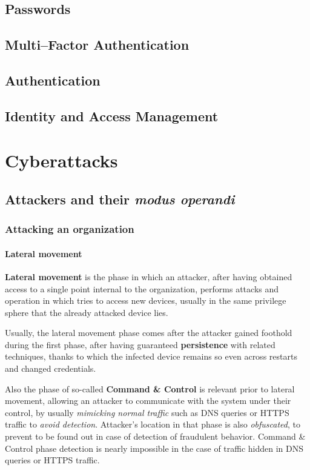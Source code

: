 \documentclass[10pt]{extbook}
\begin{document}
\chapter{Passwords}
\chapter{Multi--Factor Authentication}
\chapter{Authentication}
\chapter{Identity and Access Management}



\part{Cyberattacks}

\chapter{Attackers and their \emph{modus operandi}}

\section{Attacking an organization}

\subsection{Lateral movement}

\textbf{Lateral movement} is the phase in which an attacker, after having
obtained access to a single point internal to the organization, performs
attacks and operation in which tries to access new devices, usually in the same
privilege sphere that the already attacked device lies. 

Usually, the lateral
movement phase comes after the attacker gained foothold during the first phase,
after having guaranteed \textbf{persistence} with related techniques, thanks to
which the infected device remains so even across restarts and changed
credentials. 

Also the phase of so\--called \textbf{Command \& Control} is
relevant prior to lateral movement, allowing an attacker to communicate with
the system under their control, by usually \emph{mimicking normal traffic} such
as DNS queries or HTTPS traffic to \emph{avoid detection}. Attacker's location
in that phase is also \emph{obfuscated}, to prevent to be found out in case of
detection of fraudulent behavior. Command \& Control phase detection is nearly
impossible in the case of traffic hidden in DNS queries or HTTPS traffic. 
\end{document}

